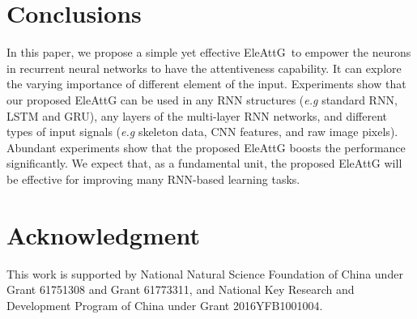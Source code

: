 \documentclass[journal]{IEEEtran}
\newcommand{\EleAttG}{{EleAttG~}}
\begin{document}
\section{Conclusions}

In this paper, we propose a simple yet effective \EleAttG to empower the neurons in recurrent neural networks to have the attentiveness capability. It can explore the varying importance of different element of the input. Experiments show that our proposed EleAttG can be used in any RNN structures ({\it{e.g}} standard RNN, LSTM and GRU), any layers of the multi-layer RNN networks, and different types of input signals ({\it{e.g}} skeleton data, CNN features, and raw image pixels). Abundant experiments show that the proposed EleAttG boosts the performance significantly. We expect that, as a fundamental unit, the proposed EleAttG will be effective for improving many RNN-based learning tasks.


\section*{Acknowledgment}
This work is supported by National Natural Science Foundation of China under Grant 61751308 and Grant 61773311, and National Key Research and Development Program of China under Grant 2016YFB1001004.



















\ifCLASSOPTIONcaptionsoff
  \newpage
\fi
\end{document}
